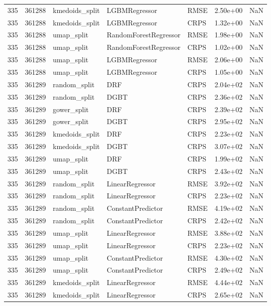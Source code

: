 \begin{tabular}{rrlllrr}
335 & 361288 & kmedoids\_split & LGBMRegressor & RMSE & 2.50e+00 & NaN \\
335 & 361288 & kmedoids\_split & LGBMRegressor & CRPS & 1.32e+00 & NaN \\
335 & 361288 & umap\_split & RandomForestRegressor & RMSE & 1.98e+00 & NaN \\
335 & 361288 & umap\_split & RandomForestRegressor & CRPS & 1.02e+00 & NaN \\
335 & 361288 & umap\_split & LGBMRegressor & RMSE & 2.06e+00 & NaN \\
335 & 361288 & umap\_split & LGBMRegressor & CRPS & 1.05e+00 & NaN \\
335 & 361289 & random\_split & DRF & CRPS & 2.04e+02 & NaN \\
335 & 361289 & random\_split & DGBT & CRPS & 2.36e+02 & NaN \\
335 & 361289 & gower\_split & DRF & CRPS & 2.39e+02 & NaN \\
335 & 361289 & gower\_split & DGBT & CRPS & 2.95e+02 & NaN \\
335 & 361289 & kmedoids\_split & DRF & CRPS & 2.23e+02 & NaN \\
335 & 361289 & kmedoids\_split & DGBT & CRPS & 3.07e+02 & NaN \\
335 & 361289 & umap\_split & DRF & CRPS & 1.99e+02 & NaN \\
335 & 361289 & umap\_split & DGBT & CRPS & 2.43e+02 & NaN \\
335 & 361289 & random\_split & LinearRegressor & RMSE & 3.92e+02 & NaN \\
335 & 361289 & random\_split & LinearRegressor & CRPS & 2.23e+02 & NaN \\
335 & 361289 & random\_split & ConstantPredictor & RMSE & 4.19e+02 & NaN \\
335 & 361289 & random\_split & ConstantPredictor & CRPS & 2.42e+02 & NaN \\
335 & 361289 & umap\_split & LinearRegressor & RMSE & 3.88e+02 & NaN \\
335 & 361289 & umap\_split & LinearRegressor & CRPS & 2.23e+02 & NaN \\
335 & 361289 & umap\_split & ConstantPredictor & RMSE & 4.30e+02 & NaN \\
335 & 361289 & umap\_split & ConstantPredictor & CRPS & 2.49e+02 & NaN \\
335 & 361289 & kmedoids\_split & LinearRegressor & RMSE & 4.44e+02 & NaN \\
335 & 361289 & kmedoids\_split & LinearRegressor & CRPS & 2.65e+02 & NaN \\

\end{tabular}
